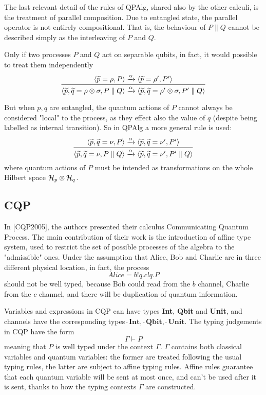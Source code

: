 
The last relevant detail of the rules of QPAlg, shared also by the other calculi, is the treatment of parallel composition. Due to entangled state, the parallel operator is not entirely compositional. That is, the behaviour of $P\parallel Q$ cannot be described simply as the interleaving of $P$ and $Q$.

Only if two processes $P$ and $Q$ act on separable qubits, in fact, it would possible to treat them independently
\[ \infer{\langle \widetilde{p},\widetilde{q}=\rho\otimes\sigma, P\parallel Q\rangle \xrightarrow{\alpha} \langle \widetilde{p},\widetilde{q}=\rho'\otimes\sigma, P'\parallel Q\rangle}{\langle \widetilde{p}=\rho, P\rangle \xrightarrow{\alpha} \langle \widetilde{p}=\rho', P'\rangle}\]


But when $p, q$ are entangled, the quantum actions of $P$ cannot always be considered "local" to the process, as they effect also the value of $q$ (despite being labelled as internal transition). So in QPAlg a more general rule is used:
\[\infer{\langle \widetilde{p},\widetilde{q}=\nu, P\parallel Q\rangle \xrightarrow{\alpha} \langle \widetilde{p},\widetilde{q}=\nu', P'\parallel Q\rangle}{\langle \widetilde{p}, \widetilde{q}=\nu, P\rangle \xrightarrow{\alpha} \langle \widetilde{p}, \widetilde{q}=\nu', P'\rangle}\]
where quantum actions of $P$ must be intended as transformations on the whole Hilbert space $\mathcal{H}_p \otimes \mathcal{H}_q$.



\subsection{CQP}


In [CQP2005], the authors presented their calculus Communicating Quantum Process. The main contribution of their work is the introduction of affine type system, used to restrict the set of possible processes of the algebra to the "admissible" ones. Under the assumption that Alice, Bob and Charlie are in three different physical location, in fact, the process \[Alice = b!q.c!q.P\] should not be well typed, because Bob could read from the $b$ channel, Charlie from the $c$ channel, and there will be duplication of quantum information. 


Variables and expressions in CQP can have types \textbf{Int}, \textbf{Qbit} and \textbf{Unit}, and channels have the corresponding types $\widehat{\ }\textbf{Int}$, $\widehat{\ }\textbf{Qbit}$, $\widehat{\ }\textbf{Unit}$.
The typing judgements in CQP have the form \[\Gamma \vdash P\] meaning that $P$ is well typed under the context $\Gamma$. $\Gamma$ contains both classical variables and quantum variables: the former are treated following the usual typing rules, the latter are subject to affine typing rules. Affine rules guarantee that each quantum variable will be sent at most once, and can't be used after it is sent, thanks to how the typing contexts $\Gamma$ are constructed.



